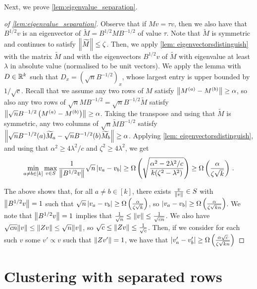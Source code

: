 Next, we prove \cref{lem:eigenvalue_separation}.

\begin{proof}[of \cref{lem:eigenvalue_separation}]
Observe that if $Mv = \tau v$, then we also have that $B^{1/2}v$ is an eigenvector of $\widetilde{M} = B^{1/2} M B^{-1/2}$ of value $\tau$.
Note that $\widetilde{M}$ is symmetric and continues to satisfy $\left\lVert\widetilde{M}\right\rVert\leq \zeta$.
Then, we apply \cref{lem: eigenvectorsdistinguish} with the matrix $\widetilde{M}$ and with the eigenvectors $B^{1/2} v$ of $\widetilde{M}$ with eigenvalue at least $\lambda$ in absolute value (normalised to be unit vectors).
We apply the lemma with $D \in {\mathbb R}^k$ such that $D_x = (\sqrt{n} B^{-1/2})_x$, whose largest entry is upper bounded by $1/\sqrt{c}$.
Recall that we assume any two rows of $M$ satisfy $\left\lVert M^{(a)} - M^{(b)}\right\rVert \geq \alpha$, so also any two rows of $\sqrt{n} M B^{-1/2} = \sqrt{n} B^{-1/2} \widetilde{M}$ satisfy $\left\lVert\sqrt{n}B^{-1/2} \left(M^{(a)} - M^{(b)}\right)\right\rVert \geq \alpha$.
Taking the transpose and using that $\widetilde{M}$ is symmetric, any two columns of $\sqrt{n} \widetilde{M} B^{-1/2}$ satisfy $\left\lVert\sqrt{n}B^{-1/2}(a) \widetilde{M}_a - \sqrt{n}B^{-1/2}(b) \widetilde{M}_b\right\rVert \geq \alpha$.
Applying \cref{lem: eigenvectorsdistinguish}, and using that $\alpha^2 \geq 4 \lambda^2 /c$ and $\zeta^2 \geq 4 \lambda^2$, we get 
\[\min_{a\neq b\in[k]}\max_{v \in S} \frac{1}{\left\lVert B^{1/2}v\right\rVert} \sqrt{n} \left\lvert v_a- v_b\right\rvert \geq \Omega\left(\sqrt{\frac{\alpha^2 - 2\lambda^2/c}{k(\zeta^2-\lambda^2)}}\right) \geq \Omega\left(\frac{\alpha}{\zeta\sqrt{k}}\right)\,.\]

The above shows that, for all $a \neq b \in [k]$, there exists $\frac{v}{\left\lVert v\right\rVert} \in S$ with $\left\lVert B^{1/2}v\right\rVert=1$ such that $\sqrt{n}\left\lvert v_a - v_b\right\rvert \geq \Omega\left(\frac{\alpha}{\zeta\sqrt{k}}\right)$, so $\left\lvert v_a - v_b\right\rvert \geq \Omega\left(\frac{\alpha}{\zeta\sqrt{kn}}\right)$.
We note that $\left\lVert B^{1/2}v\right\rVert = 1$ implies that $\frac{1}{\sqrt{n}} \leq \left\lVert v\right\rVert \leq \frac{1}{\sqrt{cn}}$.
We also have $\sqrt{c n} \lVert v\rVert \leq \lVert Zv\rVert \leq \sqrt{n} \lVert v\rVert$, so $\sqrt{c} \leq \lVert Zv\rVert \leq \frac{1}{\sqrt{c}}$.
Then, if we consider for each such $v$ some $v' \propto v$ such that $\lVert Zv'\rVert = 1$, we have that $\left\lvert v'_a - v'_b\right\rvert \geq \Omega\left(\frac{\alpha\sqrt{c}}{\zeta\sqrt{k n}}\right)$
\end{proof}

\section{Clustering with separated rows}

